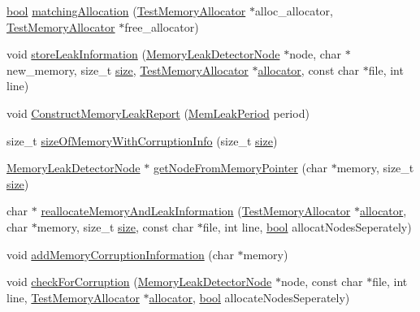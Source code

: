 \begin{DoxyCompactItemize}
\item 
\hyperlink{avb__gptp_8h_af6a258d8f3ee5206d682d799316314b1}{bool} \hyperlink{class_memory_leak_detector_acf1c0e015e90cc0ebe2b41cc1b4212b8}{matching\+Allocation} (\hyperlink{class_test_memory_allocator}{Test\+Memory\+Allocator} $\ast$alloc\+\_\+allocator, \hyperlink{class_test_memory_allocator}{Test\+Memory\+Allocator} $\ast$free\+\_\+allocator)
\item 
void \hyperlink{class_memory_leak_detector_ad65311ebd24859da19c751e2e42e796f}{store\+Leak\+Information} (\hyperlink{struct_memory_leak_detector_node}{Memory\+Leak\+Detector\+Node} $\ast$node, char $\ast$new\+\_\+memory, size\+\_\+t \hyperlink{gst__avb__playbin_8c_a439227feff9d7f55384e8780cfc2eb82}{size}, \hyperlink{class_test_memory_allocator}{Test\+Memory\+Allocator} $\ast$\hyperlink{_memory_leak_warning_test_8cpp_a83fc2e9b9142613f7df2bcc3ff8292bc}{allocator}, const char $\ast$file, int line)
\item 
void \hyperlink{class_memory_leak_detector_a4a0939ba826695d9def779d703dcb93f}{Construct\+Memory\+Leak\+Report} (\hyperlink{_memory_leak_detector_8h_ab248e6cc6c6699b88b002286d8a3ed76}{Mem\+Leak\+Period} period)
\item 
size\+\_\+t \hyperlink{class_memory_leak_detector_a76ae083bcac4cbedfca13eeee9876b10}{size\+Of\+Memory\+With\+Corruption\+Info} (size\+\_\+t \hyperlink{gst__avb__playbin_8c_a439227feff9d7f55384e8780cfc2eb82}{size})
\item 
\hyperlink{struct_memory_leak_detector_node}{Memory\+Leak\+Detector\+Node} $\ast$ \hyperlink{class_memory_leak_detector_aa0753191c429f0e32e527693767e3cb2}{get\+Node\+From\+Memory\+Pointer} (char $\ast$memory, size\+\_\+t \hyperlink{gst__avb__playbin_8c_a439227feff9d7f55384e8780cfc2eb82}{size})
\item 
char $\ast$ \hyperlink{class_memory_leak_detector_aa670d663e64a85135a23f26c124e5bd7}{reallocate\+Memory\+And\+Leak\+Information} (\hyperlink{class_test_memory_allocator}{Test\+Memory\+Allocator} $\ast$\hyperlink{_memory_leak_warning_test_8cpp_a83fc2e9b9142613f7df2bcc3ff8292bc}{allocator}, char $\ast$memory, size\+\_\+t \hyperlink{gst__avb__playbin_8c_a439227feff9d7f55384e8780cfc2eb82}{size}, const char $\ast$file, int line, \hyperlink{avb__gptp_8h_af6a258d8f3ee5206d682d799316314b1}{bool} allocat\+Nodes\+Seperately)
\item 
void \hyperlink{class_memory_leak_detector_a1589a2a78f1b6ddd3f2466902abad2fe}{add\+Memory\+Corruption\+Information} (char $\ast$memory)
\item 
void \hyperlink{class_memory_leak_detector_ae260d75b307f341763273c1e99a11c1d}{check\+For\+Corruption} (\hyperlink{struct_memory_leak_detector_node}{Memory\+Leak\+Detector\+Node} $\ast$node, const char $\ast$file, int line, \hyperlink{class_test_memory_allocator}{Test\+Memory\+Allocator} $\ast$\hyperlink{_memory_leak_warning_test_8cpp_a83fc2e9b9142613f7df2bcc3ff8292bc}{allocator}, \hyperlink{avb__gptp_8h_af6a258d8f3ee5206d682d799316314b1}{bool} allocate\+Nodes\+Seperately)
\end{DoxyCompactItemize}
